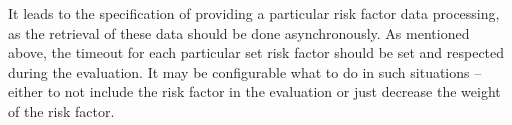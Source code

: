 It leads to the specification of providing a particular risk factor data processing, as the retrieval of these data should be done asynchronously.
As mentioned above, the timeout for each particular set risk factor should be set and respected during the evaluation.
It may be configurable what to do in such situations -- either to not include the risk factor in the evaluation or just decrease the weight of the risk factor.